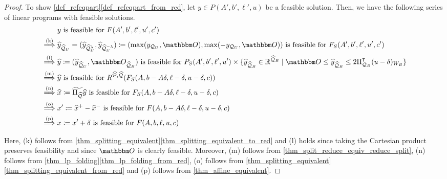 \documentclass[pdflatex,sn-mathphys-num]{sn-jnl}%
\theoremstyle{thmstyleone}%
\theoremstyle{thmstylethree}%
\theoremstyle{thmstyletwo}%
\begin{document}
\begin{proof}
    To show \cref{def_refeqpart}\ref{def_refeqpart_from_red}, let $y \in P(A',b',\ell',u)$ be a feasible solution. Then, we have the following series of linear programs with feasible solutions.
    \begin{align*}
        &y\text{ is feasible for }F(A',b',\ell',u',c')\\
        \stackrel{\textup{(k)}}\implies & \widehat{y}_{\widehat{\MQ}_U} = (\widehat{y}_{\widehat{\MQ}^\lambda_U},\widehat{y}_{\widehat{\MQ}^{-\lambda}_U}) \coloneqq (\max(y_{\MQ_U},\zerovec),\max(-y_{\MQ_U},\zerovec))\text{ is feasible for } F_S(A',b',\ell',u',c')\\
        \stackrel{\textup{(l)}}{\implies} & \widehat{y} \coloneqq (\widehat{y}_{\widehat{\MQ}_U},\zerovec_{\widehat{\MQ}_B})\text{ is feasible for } P_S(A',b',\ell',u') \times \{\widehat{y}_{\widehat{\MQ}_B} \in \R^{\widehat{\MQ}_B} \mid \zerovec \leq \widehat{y}_{\widehat{\MQ}_B} \leq 2 \transpose{\Pi_{\MQ_B}} (u - \delta)_{W_B}\}\\
        \stackrel{\textup{(m)}}{\implies} & \widehat{y}\text{ is feasible for } R^{\widehat{\MP},\widehat{\MQ}}(F_S(A,b-A\delta, \ell - \delta, u - \delta,c)) \\
        \stackrel{\textup{(n)}}\implies&
        \widehat{x} \coloneqq \widetilde{\Pi_{\widehat{\MQ}}} \widehat{y} \text{ is feasible for $F_S(A,b-A\delta, \ell - \delta, u - \delta,c)$}\\
        \stackrel{\textup{(o)}} \implies & x'\coloneqq \widehat{x}^+ - \widehat{x}^-\text{ is feasible for } F(A,b-A\delta, \ell-\delta, u-\delta,c)\\
        \stackrel{\textup{(p)}} \implies & x \coloneqq x' + \delta \text{ is feasible for $F(A,b,\ell,u,c)$}
    \end{align*}

    Here, \textup{(k)} follows from \cref{thm_splitting_equivalent}\ref{thm_splitting_equivalent_to_red} and \textup{(l)} holds since taking the Cartesian product preserves feasibility and since $\zerovec$ is clearly feasible. Moreover, \textup{(m)} follows from \cref{thm_split_reduce_equiv_reduce_split}, \textup{(n)} follows from \cref{thm_lp_folding}\ref{thm_lp_folding_from_red}, \textup{(o)} follows from \cref{thm_splitting_equivalent}\ref{thm_splitting_equivalent_from_red} and \textup{(p)} follows from \cref{thm_affine_equivalent}.    


\end{proof}
\end{document}
